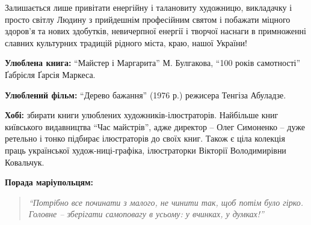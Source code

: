 \begingroup
\color{blue}
Залишається лише привітати енергійну і талановиту художницю, викладачку і
просто світлу Людину з прийдешнім професійним святом і побажати міцного
здоров'я та нових здобутків, невичерпної енергії і творчої наснаги в
примноженні славних культурних традицій рідного міста, краю, нашої України! 
\endgroup


\textbf{Улюблена книга:} \enquote{Майстер і Маргарита} М. Булгакова, \enquote{100 років самотності}
Ґабрієля Ґарсія Маркеса.

\textbf{Улюблений фільм:} \enquote{Дерево бажання} (1976 р.) режисера Тенгіза Абуладзе.

\textbf{Хобі:} збирати книги улюблених художників-ілюстраторів. Найбільше книг
київського видавництва \enquote{Час майстрів}, адже директор – Олег Симоненко – дуже
ретельно і тонко підбирає ілюстраторів до своїх книг. Також є ціла колекція
праць української худож\hyp{}ниці-графіка, ілюстраторки Вікторії Володимирівни
Ковальчук.

\textbf{Порада маріупольцям:} 

\begin{quote}
\em\enquote{Потрібно все починати з малого, не чинити так, щоб потім було гірко. Головне –
зберігати самоповагу в усьому: у вчинках, у думках!}
\end{quote}

